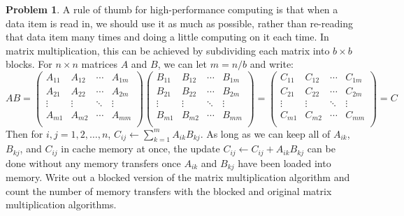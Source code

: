 \documentclass{article}
\theoremstyle{definition}
\newtheorem{problem}{Problem}[subsection]
\begin{document}
	\newpage
	\setcounter{problem}{2}
	\begin{problem}
		A rule of thumb for high-performance computing is that when a data item is read
		in, we should use it as much as possible, rather than re-reading that data item
		many times and doing a little computing on it each time. In matrix multiplication, this can be achieved by subdividing each matrix into \(b\times b\) blocks. For \(n\times n\) matrices \(A\) and \(B\), we can let \(m = n/b\) and write:
		\[
		AB = \begin{pmatrix}
			A_{11} & A_{12} & \cdots & A_{1m}\\
			A_{21} & A_{22} & \cdots & A_{2m}\\
			\vdots & \vdots & \ddots & \vdots\\
			A_{m1} & A_{m2} & \cdots & A_{mm}\\
		\end{pmatrix}
		\begin{pmatrix}
			B_{11} & B_{12} & \cdots & B_{1m}\\
			B_{21} & B_{22} & \cdots & B_{2m}\\
			\vdots & \vdots & \ddots & \vdots\\
			B_{m1} & B_{m2} & \cdots & B_{mm}\\
		\end{pmatrix}
		=     
		\begin{pmatrix}
			C_{11} & C_{12} & \cdots & C_{1m}\\
			C_{21} & C_{22} & \cdots & C_{2m}\\
			\vdots & \vdots & \ddots & \vdots\\
			C_{m1} & C_{m2} & \cdots & C_{mm}\\
		\end{pmatrix}
		= C
		\]
		Then for \(i,j=1,2,\ldots,n\), \(C_{ij}\gets \sum_{k=1}^m A_{ik}B_{kj}\). As long as we can keep all of \(A_{ik}\), \(B_{kj}\), and \(C_{ij}\) in cache memory at once, the update \(C_{ij} \gets C_{ij} + A_{ik}B_{kj}\) can be done without any memory transfers once \(A_{ik}\) and \(B_{kj}\) have been loaded
		into memory. Write out a blocked version of the matrix multiplication algorithm
		and count the number of memory transfers with the blocked and original matrix
		multiplication algorithms.
	\end{problem}
	
\end{document}
